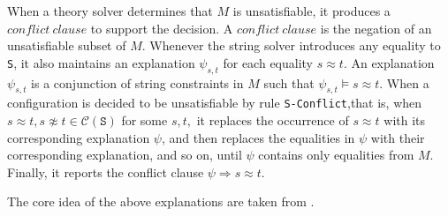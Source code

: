 When a theory solver determines that $M$ is unsatisfiable, it produces a $conflict\ clause$ to support the decision. A $conflict\ clause$ is the negation of an unsatisfiable subset of $M$. Whenever the string solver introduces any equality to \texttt{S}, it also maintains an explanation $ \psi_{s,t}$ for each equality $s \approx t$. An explanation $\psi_{s,t}$ is a conjunction of string constraints in $M$ such that $\psi_{s,t} \models s \approx t$. When a configuration is decided to be unsatisfiable by rule \texttt{S-Conflict},that is, when $ s \approx t, s \not\approx t \in \mathcal{C}(\texttt{S})$ for some $s, t,$ it replaces the occurrence of $s \approx t$ with its corresponding explanation $\psi$, and then replaces the equalities in $\psi$ with their corresponding explanation, and so on, until $\psi$ contains only equalities from $M$. Finally, it reports the conflict clause 
$ \psi \Rightarrow s \approx t$.

The core idea of the above explanations are taken from \cite{main-paper}.